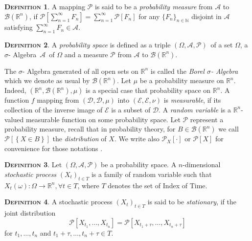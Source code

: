 \documentclass[a4paper, twoside, 11pt]{article}
\theoremstyle{definition}
\newtheorem{definition}{\scshape Definition}[section]
\def\AA{$\mathscr{A}$\ }
\def\sa{$\sigma$- Algebra\ }
\def\bs{$(\Omega, \mathscr{A}, \mathcal{P})$\ }
\def\bsigma{\mathscr{B}\brkt{\mathbb{R}^{n}}}
\newcommand{\sqbr}[1]{\left[ {#1} \right]}
\newcommand{\brkt}[1]{\left({#1} \right)}
\begin{document}
\begin{definition}
  A mapping $\mathcal{P}$ is said to be a \emph{probability measure} from $\mathscr{A}$ to $\bsigma$, if $\mathcal{P}\sqbr{\sum_{n=1}^{\infty} F_n} = \sum_{n=1}^{\infty} \mathcal{P}\sqbr{F_n}$ for any $\{F_n\}_{n \in \mathbb{N}}$ disjoint in $\mathscr{A}$ satisfying $\sum_{n=1}^{\infty}F_n \in \mathscr{A}$. 
\end{definition}

\begin{definition}
  A \emph{probability space} is defined as a triple \bs of a set $\Omega$, a \sa \AA  of $\Omega$ and a measure $\mathcal{P}$ from $\mathscr{A}$ to $\bsigma$.
\end{definition}

The $\sigma$- Algebra generated of all open sets on $\mathbb{R}^{n}$ is called the \emph{Borel $\sigma$- Algebra} which we denote as usual by $\mathscr{B}\left(\mathbb{R}^{n}\right)$. Let $\mu$ be a probability measure on $\mathbb{R}^{n}$. Indeed, $\brkt{\mathbb{R}^{n}, \mathscr{B}\brkt{\mathbb{R}^{n}}, \mu}$ is a special case that probability space on $\mathbb{R}^{n}$. A function $f$ mapping from $\brkt{\mathcal{D}, \mathscr{D}, \mu}$ into $\brkt{\mathcal{E}, \mathscr{E}, \nu}$ is \emph{measurable}, if its collection of the inverse image of $\mathscr{E}$ is a subset of $\mathscr{D}$. A \emph{random variable} is a $\mathbb{R}^{n}$-valued measurable function on some probability space. Let $\mathcal{P}$ represent a probability measure, recall that in probability theory, for $B \in \bsigma$ we call $\mathcal{P}\sqbr{\left\{X \in B\right\}}$ the \emph{distribution} of $X$. We write also $\mathcal{P}_X \sqbr{\cdot}$ or $\mathcal{P}\sqbr{X}$ for convenience for those notations .

\begin{definition}
  Let $\brkt{\Omega, \mathscr{A}, \mathcal{P}}$ be a probability space. A $n$-dimensional \emph{stochastic process} $\brkt{X_t}_{t\in T}$ is a family of random variable such that $X_t\brkt{\omega} : \Omega \longrightarrow  \mathbb{R}^{n},  \forall t \in T$, where $T$ denotes the set of Index of Time.    
\end{definition}

\begin{definition}
  A stochastic process $\brkt{X_t}_{t \in T}$ is said to be \emph{stationary}, if the joint distribution 
\[
  \mathcal{P}\sqbr{X_{t_1},\dots,X_{t_n}} = \mathcal{P}\sqbr{X_{t_1+\tau},\dots,X_{t_n+\tau}} 
\]
for $t_1, \dots, t_n$ and $t_1+\tau,\dots,t_n+\tau \in T$. 
\label{sec:stn}
\end{definition}
\end{document}
